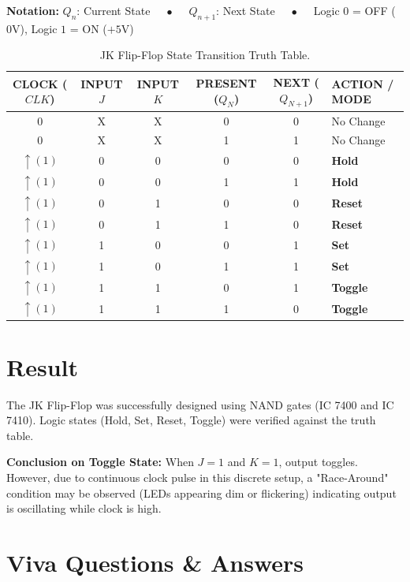 \noindent \textbf{Notation:} $Q_n$: Current State $\quad \bullet \quad$ $Q_{n+1}$: Next State $\quad \bullet \quad$ Logic $0$ = OFF ($0\text{V}$), Logic $1$ = ON ($+5\text{V}$)

\begin{table}[htbp]
\centering
\small
\begin{tabularx}{\textwidth}{c c c c c X}
\toprule
\textbf{CLOCK ($CLK$)} & \textbf{INPUT $J$} & \textbf{INPUT $K$} & \textbf{PRESENT ($Q_N$)} & \textbf{NEXT ($Q_{N+1}$)} & \textbf{ACTION / MODE} \\
\midrule
0 & X & X & 0 & 0 & No Change \\
0 & X & X & 1 & 1 & No Change \\
$\uparrow (1)$ & 0 & 0 & 0 & 0 & \textbf{Hold} \\
$\uparrow (1)$ & 0 & 0 & 1 & 1 & \textbf{Hold} \\
$\uparrow (1)$ & 0 & 1 & 0 & 0 & \textbf{Reset} \\
$\uparrow (1)$ & 0 & 1 & 1 & 0 & \textbf{Reset} \\
$\uparrow (1)$ & 1 & 0 & 0 & 1 & \textbf{Set} \\
$\uparrow (1)$ & 1 & 0 & 1 & 1 & \textbf{Set} \\
$\uparrow (1)$ & 1 & 1 & 0 & 1 & \textbf{Toggle} \\
$\uparrow (1)$ & 1 & 1 & 1 & 0 & \textbf{Toggle} \\
\bottomrule
\end{tabularx}
\caption{JK Flip-Flop State Transition Truth Table.}
\label{tab:jk-truth-table}
\end{table}

\section{Result}
The JK Flip-Flop was successfully designed using NAND gates (IC 7400 and IC 7410). Logic states (Hold, Set, Reset, Toggle) were verified against the truth table.

\textbf{Conclusion on Toggle State:} When $J=1$ and $K=1$, output toggles. However, due to continuous clock pulse in this discrete setup, a "Race-Around" condition may be observed (LEDs appearing dim or flickering) indicating output is oscillating while clock is high.

\section{Viva Questions \& Answers}

